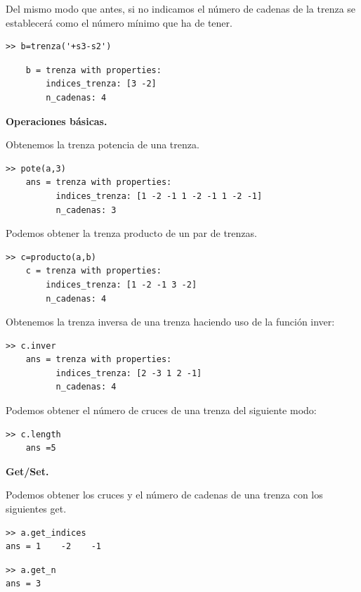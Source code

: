 Del mismo modo que antes, si no indicamos el número de cadenas de la trenza se establecerá como el número mínimo que ha de tener. 
\begin{lstlisting}
>> b=trenza('+s3-s2')
\end{lstlisting}
\begin{lstlisting}
	b = trenza with properties:
	    indices_trenza: [3 -2]
	    n_cadenas: 4
\end{lstlisting}



\newpage
\begin{center}
	\textbf{Operaciones básicas.}
\end{center}
Obtenemos la trenza potencia de una trenza.
\begin{lstlisting}
>> pote(a,3)
	ans = trenza with properties:
	      indices_trenza: [1 -2 -1 1 -2 -1 1 -2 -1] 
	      n_cadenas: 3
\end{lstlisting}


Podemos obtener la trenza producto de un par de trenzas.
\begin{lstlisting}
>> c=producto(a,b)
	c = trenza with properties:
	    indices_trenza: [1 -2 -1 3 -2]
	    n_cadenas: 4
\end{lstlisting}

Obtenemos la trenza inversa de una trenza haciendo uso de la función inver:
\begin{lstlisting}
>> c.inver
	ans = trenza with properties:
	      indices_trenza: [2 -3 1 2 -1]
	      n_cadenas: 4
\end{lstlisting}

Podemos obtener el número de cruces de una trenza del siguiente modo:
\begin{lstlisting}
>> c.length
	ans =5
\end{lstlisting}

\begin{center}
	\textbf{Get/Set.}
\end{center}
Podemos obtener los cruces y el número de cadenas de una trenza con los siguientes get. 
\begin{lstlisting}
>> a.get_indices
ans = 1    -2    -1
\end{lstlisting}

\begin{lstlisting}
>> a.get_n
ans = 3
\end{lstlisting}

